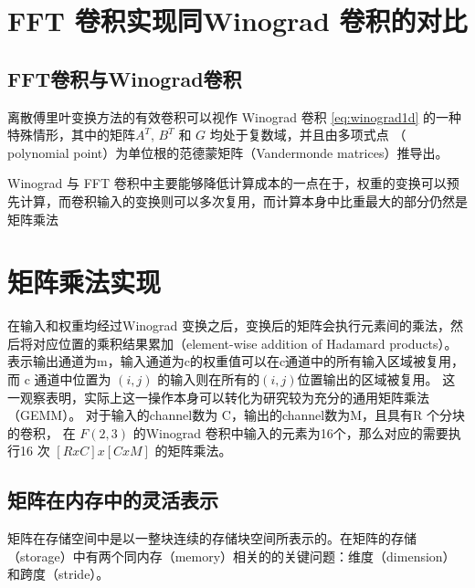 \section{FFT 卷积实现同Winograd 卷积的对比}


\subsection{FFT卷积与Winograd卷积}
离散傅里叶变换方法的有效卷积可以视作 Winograd 卷积 \ref{eq:winograd1d} 的一种特殊情形，其中的矩阵$A^T$, $B^T$ 和 $G$ 均处于复数域，并且由多项式点
（ polynomial point）为单位根的范德蒙矩阵（Vandermonde matrices）推导出。

Winograd 与 FFT 卷积中主要能够降低计算成本的一点在于，权重的变换可以预先计算，而卷积输入的变换则可以多次复用，而计算本身中比重最大的部分仍然是矩阵乘法


\section{矩阵乘法实现}

在输入和权重均经过Winograd 变换之后，变换后的矩阵会执行元素间的乘法，然后将对应位置的乘积结果累加（element-wise addition of Hadamard products）。
表示输出通道为m，输入通道为c的权重值可以在c通道中的所有输入区域被复用，
而 c 通道中位置为 $(i, j)$ 的输入则在所有的$(i,j )$位置输出的区域被复用。 这一观察表明，实际上这一操作本身可以转化为研究较为充分的通用矩阵乘法（GEMM）。
对于输入的channel数为 C，输出的channel数为M，且具有R 个分块的卷积， 在 $F(2, 3)$ 的Winograd 卷积中输入的元素为16个，那么对应的需要执行16 次 $[RxC]x[CxM] $
的矩阵乘法。


\subsection{矩阵在内存中的灵活表示}
矩阵在存储空间中是以一整块连续的存储块空间所表示的。在矩阵的存储（storage）中有两个同内存（memory）相关的的关键问题：维度（dimension）和跨度（stride）。

